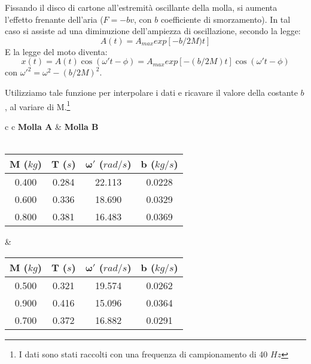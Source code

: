 Fissando il disco di cartone all'estremità oscillante della molla, si aumenta l'effetto frenante dell'aria ($F=-bv$, con $b$ coefficiente di smorzamento).  
In tal caso si assiste ad una diminuzione dell'ampiezza di oscillazione, secondo la legge:
\begin{equation}\label{Asm}
A(t)=A_{max}exp[-b/2M)t]
\end{equation}
E la legge del moto diventa:
\begin{equation}
x(t)=A(t)\cos(\omega't-\phi)=A_{max}exp[-(b/2M)t]\cos(\omega't-\phi)
\end{equation}
con $\omega'^2=\omega^2-(b/2M)^2$.

Utilizziamo tale funzione per interpolare i dati e ricavare il valore della costante $b$, al variare di M.\footnote{I dati sono stati raccolti con una frequenza di campionamento di 40 $Hz$}
\begin{center}

\begin{tabular}{c c}
\textbf{Molla A} & \hspace{1cm} \textbf{Molla B}\\
\\
\begin{tabular}{c | c | c | c}
$\boldsymbol{M}$ ($kg$) & $\boldsymbol{T}$ ($s$) & $\boldsymbol{\omega'}$ ($rad/s$) & $\boldsymbol{b}$ ($kg/s$)\\
\midrule
0.400 & 0.284 & 22.113 & 0.0228\\
0.600 & 0.336 & 18.690 & 0.0329\\
0.800 & 0.381 & 16.483 & 0.0369\\
\end{tabular}

& \hspace{1cm}

\begin{tabular}{c | c | c | c}
$\boldsymbol{M}$ ($kg$) & $\boldsymbol{T}$ ($s$) & $\boldsymbol{\omega'}$ ($rad/s$) & $\boldsymbol{b}$ ($kg/s$)\\
\midrule
0.500 & 0.321 & 19.574 & 0.0262\\
0.900 & 0.416 & 15.096 & 0.0364\\
0.700 & 0.372 & 16.882 & 0.0291\\
\end{tabular}

\end{tabular}

\end{center}

